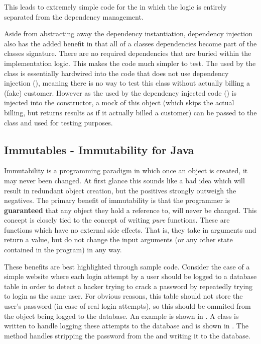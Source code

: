 This leads to extremely simple code for the  in which the logic is entirely separated from the dependency management.



Aside from abstracting away the dependency instantiation, dependency injection also has the added benefit in that all of a classes dependencies become part of the classes signature. There are no required dependencies that are buried within the implementation logic. This makes the code much simpler to test. The  used by the class is essentially hardwired into the code that does not use dependency injection (), meaning there is no way to test this class without actually billing a (fake) customer. However as the  used by the dependency injected code () is injected into the constructor, a mock of this object (which skips the actual billing, but returns results as if it actually billed a customer) can be passed to the class and used for testing purposes.   

\subsection{Immutables - Immutability for Java}
Immutability is a programming paradigm in which once an object is created, it may never been changed. At first glance this sounds like a bad idea which will result in redundant object creation, but the positives strongly outweigh the negatives. The primary benefit of immutability is that the programmer is \textbf{guaranteed} that any object they hold a reference to, will never be changed. This concept is closely tied to the concept of writing \textit{pure} functions. These are functions which have no external side effects. That is, they take in arguments and return a value, but do not change the input arguments (or any other state contained in the program) in any way. 

These benefits are best highlighted through sample code. Consider the case of a simple website where each login attempt by a user should be logged to a database table in order to detect a hacker trying to crack a password by repeatedly trying to login as the same user. For obvious reasons, this table should not store the user's password (in case of real login attempts), so this should be ommited from the object being logged to the database. An example  is shown in . A  class is written to handle logging these attempts to the database and is shown in . The  method handles stripping the password from the  and writing it to the database. 


